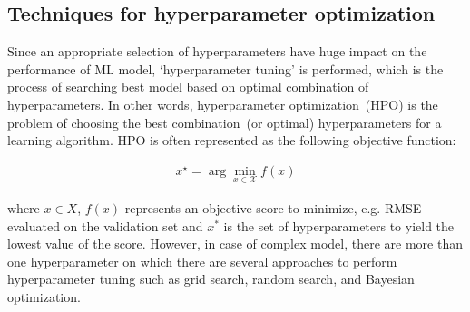 \subsection{Techniques for hyperparameter optimization}
Since an appropriate selection of hyperparameters have huge impact on the performance of ML model, `hyperparameter tuning' is performed, which is the process of searching best model based on optimal combination of hyperparameters. In other words, hyperparameter optimization~(HPO) is the problem of choosing the best combination~(or optimal) hyperparameters for a learning algorithm. HPO is often represented as the following objective function: 

\vspace{-6mm}
\begin{align}
    x^{\star}=\arg \min _{x \in \mathcal{X}} f(x)
    \label{eq:hpt}
\end{align}

where $x \in X$, $f(x)$ represents an objective score to minimize, e.g. RMSE evaluated on the validation set and $x^*$ is the set of hyperparameters to yield the lowest value of the score. However, in case of complex model, there are more than one hyperparameter on which there are several approaches to perform hyperparameter tuning such as grid search, random search, and Bayesian optimization. 


